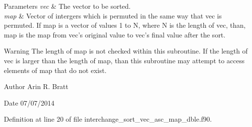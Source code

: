 \begin{DoxyParams}{Parameters}
{\em vec} & The vector to be sorted.\\
\hline
{\em map} & Vector of intergers which is permuted in the same way that vec is permuted. If map is a vector of values 1 to N, where N is the length of vec, than, map is the map from vec's original value to vec's final value after the sort.\\
\hline
\end{DoxyParams}
\begin{DoxyWarning}{Warning}
The length of map is not checked within this subroutine. If the length of vec is larger than the length of map, than this subroutine may attempt to access elements of map that do not exist.
\end{DoxyWarning}
\begin{DoxyAuthor}{Author}
Arin R. Bratt 
\end{DoxyAuthor}
\begin{DoxyDate}{Date}
07/07/2014 
\end{DoxyDate}


Definition at line 20 of file interchange\-\_\-sort\-\_\-vec\-\_\-asc\-\_\-map\-\_\-dble.\-f90.

